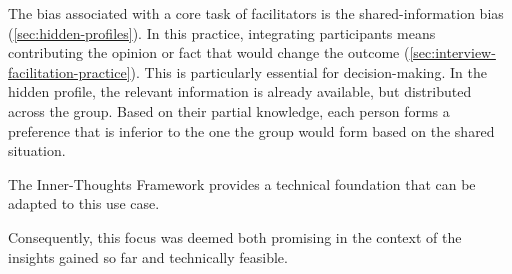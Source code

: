 The bias associated with a core task of facilitators is the shared-information bias
(\autoref{sec:hidden-profiles}). In this practice, integrating participants means contributing the opinion or
fact that would change the outcome
(\autoref{sec:interview-facilitation-practice}). This is particularly essential for decision-making.
In the hidden profile, the relevant information is already available, but distributed across the group. Based
on their partial knowledge, each person forms a preference that is inferior to the one the group would form
based on the shared situation.

The Inner-Thoughts Framework provides a technical foundation that can be adapted to this use case.

Consequently, this focus was deemed both promising in the context of the insights gained so far and
technically feasible.